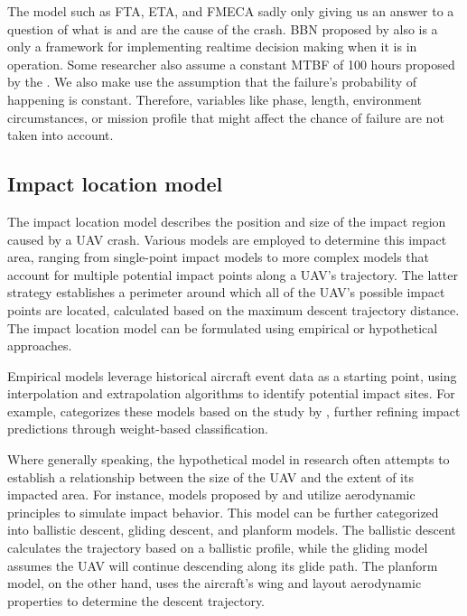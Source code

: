 \documentclass[12pt]{report}
\begin{document}
            The model such as FTA, ETA, and FMECA sadly only giving us an answer to a question of what is and are the
            cause of the crash. BBN proposed by \cite{ancel_real-time_2017} also is a only a framework for implementing
            realtime decision making when it is in operation. Some researcher also assume a  constant MTBF of 100 hours
            proposed by the \cite{arc_unmanned_2015}.  We also make  use the assumption that the failure's probability
            of happening is constant. Therefore, variables like phase, length, environment circumstances, or mission
            profile that might affect the chance of failure are not taken into account.

        \subsection{Impact location model}
            The impact location model describes the position and size of the impact region caused by a UAV crash.
            Various models are employed to determine this impact area, ranging from single-point impact models to more
            complex models that account for multiple potential impact points along a UAV's trajectory. The latter
            strategy establishes a perimeter around which all of the UAV's possible impact points are located,
            calculated based on the maximum descent trajectory distance. The impact location model can be formulated
            using empirical or hypothetical approaches.
                
            Empirical models leverage historical aircraft event data as a starting point, using interpolation and
            extrapolation algorithms to identify potential impact sites. For example, \cite{melnyk_third-party_2014}
            categorizes these models based on the study by \cite{ale_assessment_2000}, further refining impact
            predictions through weight-based classification.
                
            Where generally speaking, the hypothetical model in research often attempts to establish a relationship
            between the size of the UAV and the extent of its impacted area. For instance, models proposed by
            \cite{primatesta_ground_2020} and \cite{burke_system-level_2011} utilize aerodynamic principles to simulate
            impact behavior. This model can be further categorized into ballistic descent, gliding descent, and planform
            models. The ballistic descent calculates the trajectory based on a ballistic profile, while the gliding
            model assumes the UAV will continue descending along its glide path. The planform model, on the other hand,
            uses the aircraft's wing and layout aerodynamic properties to determine the descent trajectory.
                
\end{document}
